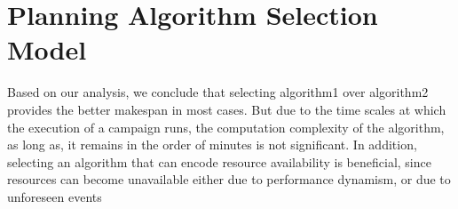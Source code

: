 %

\section{Planning Algorithm Selection Model}

Based on our analysis, we conclude that selecting algorithm1 over algorithm2 provides the better makespan in most cases. 
But due to the time scales at which the execution of a campaign runs, the computation complexity of the algorithm, as long as, it remains in the order of minutes is not significant.
In addition, selecting an algorithm that can encode resource availability is beneficial, since resources can become unavailable either due to performance dynamism, or due to unforeseen events